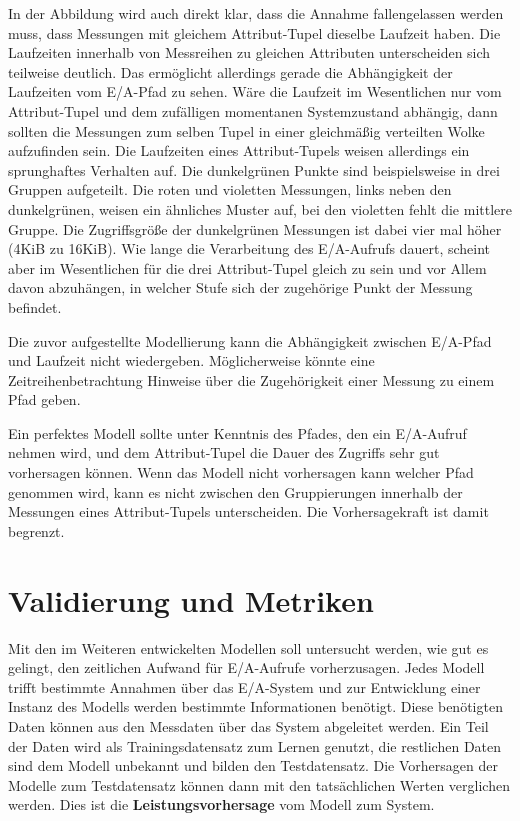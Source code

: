 \documentclass[
	12pt,
	a4paper,
	BCOR10mm,
	DIV14,
	listof=totoc,
	bibliography=totoc,
	headsepline
]{scrreprt}
\begin{document}
In der Abbildung wird auch direkt klar, dass die Annahme fallengelassen werden muss, dass Messungen mit gleichem Attribut-Tupel dieselbe Laufzeit haben. Die Laufzeiten innerhalb von Messreihen zu gleichen Attributen unterscheiden sich teilweise deutlich.
Das ermöglicht allerdings gerade die Abhängigkeit der Laufzeiten vom E/A-Pfad zu sehen.
Wäre die Laufzeit im Wesentlichen nur vom Attribut-Tupel und dem \glqq zufälligen\grqq{} momentanen Systemzustand abhängig, dann sollten die Messungen zum selben Tupel in einer gleichmäßig verteilten Wolke aufzufinden sein.
Die Laufzeiten eines Attribut-Tupels weisen allerdings ein sprunghaftes Verhalten auf. Die dunkelgrünen Punkte sind beispielsweise in drei Gruppen aufgeteilt.
Die roten und violetten Messungen, links neben den dunkelgrünen, weisen ein ähnliches Muster auf, bei den violetten fehlt die mittlere Gruppe.
Die Zugriffsgröße der dunkelgrünen Messungen ist dabei vier mal höher (4KiB zu 16KiB).
Wie lange die Verarbeitung des E/A-Aufrufs dauert, scheint aber im Wesentlichen für die drei Attribut-Tupel gleich zu sein und vor Allem davon abzuhängen, in welcher Stufe sich der zugehörige Punkt der Messung befindet.\medskip

Die zuvor aufgestellte Modellierung kann die Abhängigkeit zwischen E/A-Pfad und Laufzeit nicht wiedergeben. Möglicherweise könnte eine Zeitreihenbetrachtung Hinweise über die Zugehörigkeit einer Messung zu einem Pfad geben. 

Ein perfektes Modell sollte unter Kenntnis des Pfades, den ein E/A-Aufruf nehmen wird, und dem Attribut-Tupel die Dauer des Zugriffs sehr gut vorhersagen können. Wenn das Modell nicht vorhersagen kann welcher Pfad genommen wird, kann es nicht zwischen den Gruppierungen innerhalb der Messungen eines Attribut-Tupels unterscheiden. Die Vorhersagekraft ist damit begrenzt.

\section{Validierung und Metriken}
\label{analyse:valid}
Mit den im Weiteren entwickelten Modellen soll untersucht werden, wie gut es gelingt, den zeitlichen Aufwand für E/A-Aufrufe vorherzusagen. 
Jedes Modell trifft bestimmte Annahmen über das E/A-System und zur Entwicklung einer Instanz des Modells werden bestimmte Informationen benötigt.
Diese benötigten Daten können aus den Messdaten über das System abgeleitet werden.
Ein Teil der Daten wird als Trainingsdatensatz zum Lernen genutzt, die restlichen Daten sind dem Modell unbekannt und bilden den Testdatensatz. Die Vorhersagen der Modelle zum Testdatensatz können dann mit den tatsächlichen Werten verglichen werden. Dies ist die \textbf{Leistungsvorhersage} vom Modell zum System. \medskip
\end{document}
